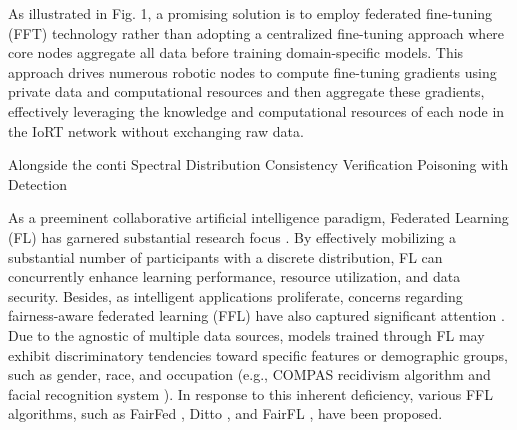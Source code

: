 \documentclass[lettersize,journal]{IEEEtran}
\begin{document}
As illustrated in Fig. 1, a promising solution is to employ federated fine-tuning (FFT) technology rather than adopting a centralized fine-tuning approach where core nodes aggregate all data before training domain-specific models. This approach drives numerous robotic nodes to compute fine-tuning gradients using private data and computational resources and then aggregate these gradients, effectively leveraging the knowledge and computational resources of each node in the IoRT network without exchanging raw data.

Alongside the conti
Spectral Distribution
Consistency Verification
Poisoning with 
Detection

As a preeminent collaborative artificial intelligence paradigm, Federated Learning (FL) has garnered substantial research focus \cite{ETT2}. 
By effectively mobilizing a substantial number of participants with a discrete distribution, FL can concurrently enhance learning performance, resource utilization, and data security. 
Besides, as intelligent applications proliferate, concerns regarding fairness-aware federated learning (FFL) have also captured significant attention \cite{zhou2021towards-KDDtutorial-FFL}. Due to the agnostic of multiple data sources, models trained through FL may exhibit discriminatory tendencies toward specific features or demographic groups, such as gender, race, and occupation (e.g., COMPAS recidivism algorithm \cite{angwin2022machine} and facial recognition system \cite{raji2019actionable}). In response to this inherent deficiency, various FFL algorithms, such as FairFed \cite{ezzeldin2023fairfed}, Ditto \cite{li2021ditto}, and FairFL \cite{zhang2020fairfl}, have been proposed.

\end{document}
